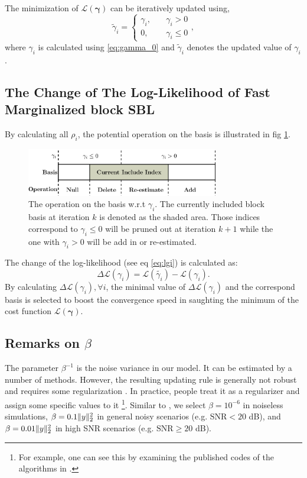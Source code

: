 The minimization of $\mathcal{L}(\bm{\gamma})$ can be iteratively 
updated using,
\begin{equation}\label{eq:lgi_solution}
\tilde\gamma_i = \left\{
\begin{aligned}
\gamma_i,\quad & \gamma_i>0 \\
0,\quad &\gamma_i\leq0
\end{aligned} \right. ,
\end{equation}
where $\gamma_i$ is calculated using \eqref{eq:gamma_0} and 
$\tilde{\gamma}_i$ denotes the updated value of $\gamma_i$.

\subsection{The Change of The Log-Likelihood of Fast Marginalized block SBL}
By calculating all $\rho_i$, the potential operation on the basis is illustrated in 
fig \ref{fig:basis_select}.
\begin{figure}[!htbp]
\centering
\includegraphics[width=3.3in]{basis_select}
\caption{The operation on the basis w.r.t $\gamma_i$. 
The currently included block basis at iteration $k$ is denoted as the shaded area.
Those indices correspond to $\gamma_i\leq0$ will be pruned out at iteration $k+1$ while
the one with $\gamma_i>0$ will be add in or re-estimated.
}\label{fig:basis_select}
\end{figure}
The change of the log-likelihood (see eq \eqref{eq:lgi}) is calculated as:
\begin{equation}
\Delta \mathcal{L}(\gamma_i) = \mathcal{L}(\tilde{\gamma_i}) - \mathcal{L}(\gamma_i).
\end{equation}
By calculating $\Delta\mathcal{L}(\gamma_i),\forall i$, 
the minimal value of $\Delta \mathcal{L}(\gamma_i)$ and the correspond basis
is selected to boost the convergence speed in saughting the minimum of 
the cost function $\mathcal{L}(\bm{\gamma})$.

\subsection{Remarks on $\beta$}

The parameter $\beta^{-1}$ is the noise variance in our model. It can be estimated by a number of methods.  However, the resulting updating rule is generally not robust and requires some regularization \cite{Zhang2012a,Zhang2011}. In practice, people treat it as a regularizer and assign some specific values to it \footnote{For example, one can see this by examining the published codes of the algorithms in \cite{Ji2008,Babacan2012}.}. Similar to \cite{Ji2008},
we select $\beta=10^{-6}$ in noiseless simulations, $\beta=0.1\Vert y\Vert_2^2$ in general noisy scenarios (e.g. $\text{SNR}<20$ dB), and $\beta=0.01\Vert y\Vert_2^2$ in high SNR scenarios (e.g. $\text{SNR}\geq20$ dB).

